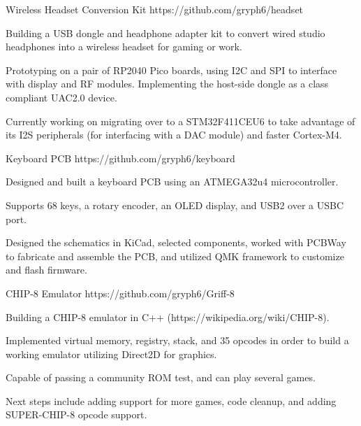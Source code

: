 
\begin{cventries}

  \cventry
    {Wireless Headset Conversion Kit} %
    {}
    {}
    {https://github.com/gryph6/headset}
    {
      \begin{cvitems} %
        \item {Building a USB dongle and headphone adapter kit to convert wired studio headphones into a wireless headset for gaming or work.} 
        \item {Prototyping on a pair of RP2040 Pico boards, using I2C and SPI to interface with display and RF modules. Implementing the host-side dongle as a class compliant UAC2.0 device.}
        \item {Currently working on migrating over to a STM32F411CEU6 to take advantage of its I2S peripherals (for interfacing with a DAC module) and faster Cortex-M4.} 
      \end{cvitems}
    }
  \cventry
    {Keyboard PCB} %
    {}
    {}
    {https://github.com/gryph6/keyboard}
    {
      \begin{cvitems} %
        \item {Designed and built a keyboard PCB using an ATMEGA32u4 microcontroller.} 
        \item {Supports 68 keys, a rotary encoder, an OLED display, and USB2 over a USBC port.}
        \item {Designed the schematics in KiCad, selected components, worked with PCBWay to fabricate and assemble the PCB, and utilized QMK framework to customize and flash firmware.}
      \end{cvitems}
    }
  \cventry
    {CHIP-8 Emulator} %
    {}
    {}
    {https://github.com/gryph6/Griff-8}
    {
      \begin{cvitems} %
      \item {Building a CHIP-8 emulator in C++ (https://wikipedia.org/wiki/CHIP-8).}
        \item{Implemented virtual memory, registry, stack, and 35 opcodes in order to build a working emulator utilizing Direct2D for graphics.}
        \item{Capable of passing a community ROM test, and can play several games.}
        \item {Next steps include adding support for more games, code cleanup, and adding SUPER-CHIP-8 opcode support.}
      \end{cvitems}
    }
\end{cventries}

